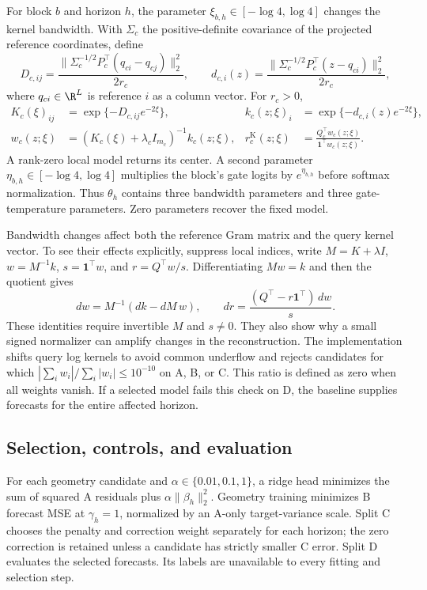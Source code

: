 For block $b$ and horizon $h$, the parameter
$\xi_{b,h}\in[-\log4,\log4]$ changes the kernel bandwidth. With
$\Sigma_c$ the positive-definite covariance of the projected reference
coordinates, define
\[
 D_{c,ij}=\frac{\|\Sigma_c^{-1/2}P_c^\top(q_{ci}-q_{cj})\|_2^2}{2r_c},
 \qquad
 d_{c,i}(z)=\frac{\|\Sigma_c^{-1/2}P_c^\top(z-q_{ci})\|_2^2}{2r_c},
\]
where $q_{ci}\in\R^L$ is reference $i$ as a column vector. For $r_c>0$,
\begin{align}
 K_c(\xi)_{ij}&=\exp\{-D_{c,ij}e^{-2\xi}\},&
 k_c(z;\xi)_i&=\exp\{-d_{c,i}(z)e^{-2\xi}\},\nonumber\\
 w_c(z;\xi)&=(K_c(\xi)+\lambda_c I_{m_c})^{-1}k_c(z;\xi),&
 r_c^{\mathrm{K}}(z;\xi)&=
 \frac{Q_c^\top w_c(z;\xi)}{\mathbf1^\top w_c(z;\xi)}.
 \label{eq:direct-kahm}
\end{align}
A rank-zero local model returns its center. A second parameter
$\eta_{b,h}\in[-\log4,\log4]$ multiplies the block's gate logits by
$e^{\eta_{b,h}}$ before softmax normalization. Thus $\theta_h$ contains
three bandwidth parameters and three gate-temperature parameters.
Zero parameters recover the fixed model.

Bandwidth changes affect both the reference Gram matrix and the query
kernel vector. To see their effects explicitly, suppress local indices,
write $M=K+\lambda I$, $w=M^{-1}k$, $s=\mathbf1^\top w$, and
$r=Q^\top w/s$. Differentiating $Mw=k$ and then the quotient gives
\begin{equation}
 dw=M^{-1}(dk-dM\,w),\qquad
 dr=\frac{(Q^\top-r\mathbf1^\top)\,dw}{s}.
 \label{eq:direct-derivative}
\end{equation}
These identities require invertible $M$ and $s\ne0$. They also show why
a small signed normalizer can amplify changes in the reconstruction.
The implementation shifts query log kernels to avoid common underflow
and rejects candidates for which
$|\sum_i w_i|/\sum_i|w_i|\leq10^{-10}$ on A, B, or C. This ratio
is defined as zero when all weights vanish. If a selected model fails this check on D, the
baseline supplies forecasts for the entire affected horizon.

\subsection{Selection, controls, and evaluation}

For each geometry candidate and $\alpha\in\{0.01,0.1,1\}$, a ridge
head minimizes the sum of squared A residuals plus
$\alpha\|\beta_h\|_2^2$. Geometry training minimizes B forecast MSE
at $\gamma_h=1$, normalized by an A-only target-variance scale.
Split C chooses the penalty and correction weight separately for each
horizon; the zero correction is retained unless a candidate has strictly
smaller C error. Split D evaluates the selected forecasts. Its labels
are unavailable to every fitting and selection step.

